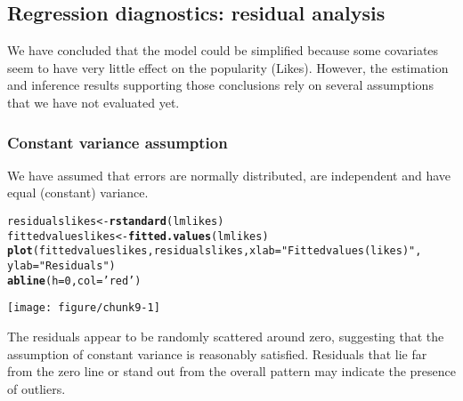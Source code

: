 \documentclass[11pt]{article}\usepackage[]{graphicx}\usepackage[]{xcolor}
\makeatletter
\newcommand{\hlnum}[1]{\textcolor[rgb]{0.686,0.059,0.569}{#1}}%
\newcommand{\hlsng}[1]{\textcolor[rgb]{0.192,0.494,0.8}{#1}}%
\newcommand{\hldef}[1]{\textcolor[rgb]{0.345,0.345,0.345}{#1}}%
\newcommand{\hlkwb}[1]{\textcolor[rgb]{0.69,0.353,0.396}{#1}}%
\newcommand{\hlkwc}[1]{\textcolor[rgb]{0.333,0.667,0.333}{#1}}%
\newcommand{\hlkwd}[1]{\textcolor[rgb]{0.737,0.353,0.396}{\textbf{#1}}}%
\newenvironment{kframe}{%
 \def\at@end@of@kframe{}%
 \ifinner\ifhmode%
  \def\at@end@of@kframe{\end{minipage}}%
  \begin{minipage}{\columnwidth}%
 \fi\fi%
 \def\FrameCommand##1{\hskip\@totalleftmargin \hskip-\fboxsep
 \colorbox{shadecolor}{##1}\hskip-\fboxsep
     \hskip-\linewidth \hskip-\@totalleftmargin \hskip\columnwidth}%
 \MakeFramed {\advance\hsize-\width
   \@totalleftmargin\z@ \linewidth\hsize
   \@setminipage}}%
 {\par\unskip\endMakeFramed%
 \at@end@of@kframe}
\newenvironment{knitrout}{}{} %
\makeatother
\begin{document}
\subsection{Regression diagnostics: residual analysis}
We have concluded that the model could be simplified because some covariates seem to have very little effect on the popularity (Likes). However, the estimation and inference results supporting those conclusions rely on several assumptions that we have not evaluated yet.

\subsubsection{Constant variance assumption}
We have assumed that errors are normally distributed, are independent and have equal (constant) variance.
\begin{knitrout}
\color{fgcolor}\begin{kframe}
\begin{alltt}
\hldef{residualslikes} \hlkwb{<-} \hlkwd{rstandard}\hldef{(lmlikes)}
\hldef{fittedvalueslikes} \hlkwb{<-} \hlkwd{fitted.values}\hldef{(lmlikes)}
\hlkwd{plot}\hldef{(fittedvalueslikes, residualslikes,} \hlkwc{xlab}\hldef{=}\hlsng{"Fitted values (likes)"}\hldef{,}
     \hlkwc{ylab}\hldef{=}\hlsng{"Residuals"}\hldef{)}
\hlkwd{abline}\hldef{(}\hlkwc{h}\hldef{=}\hlnum{0}\hldef{,} \hlkwc{col} \hldef{=} \hlsng{'red'}\hldef{)}
\end{alltt}
\end{kframe}

{\centering \texttt{[image: figure/chunk9-1]} 

}


\end{knitrout}
The residuals appear to be randomly scattered around zero, suggesting that the assumption of constant variance is reasonably satisfied. Residuals that lie far from the zero line or stand out from the overall pattern may indicate the presence of outliers.
\end{document}
